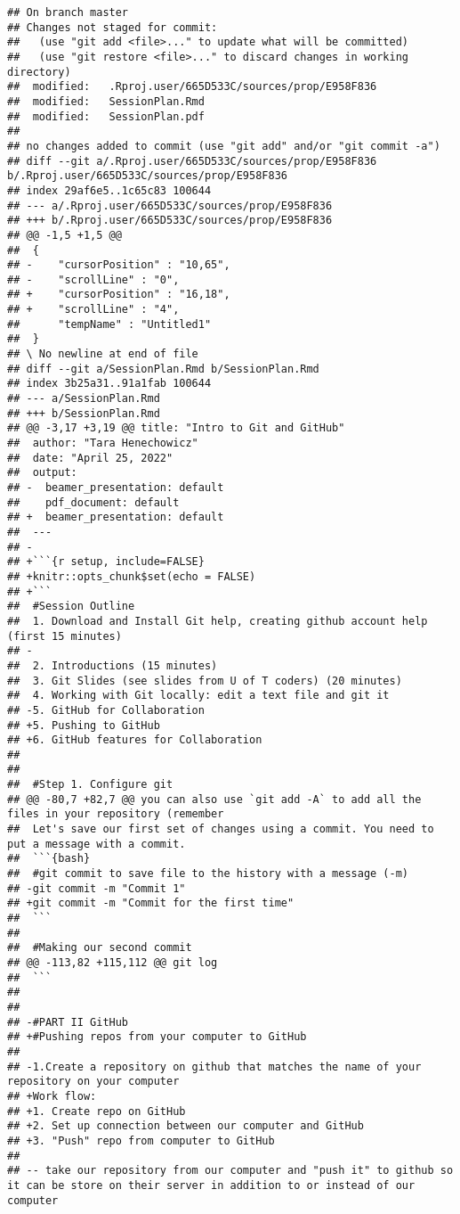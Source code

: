 \documentclass[]{article}
\begin{document}
\begin{verbatim}
## On branch master
## Changes not staged for commit:
##   (use "git add <file>..." to update what will be committed)
##   (use "git restore <file>..." to discard changes in working directory)
##  modified:   .Rproj.user/665D533C/sources/prop/E958F836
##  modified:   SessionPlan.Rmd
##  modified:   SessionPlan.pdf
## 
## no changes added to commit (use "git add" and/or "git commit -a")
## diff --git a/.Rproj.user/665D533C/sources/prop/E958F836 b/.Rproj.user/665D533C/sources/prop/E958F836
## index 29af6e5..1c65c83 100644
## --- a/.Rproj.user/665D533C/sources/prop/E958F836
## +++ b/.Rproj.user/665D533C/sources/prop/E958F836
## @@ -1,5 +1,5 @@
##  {
## -    "cursorPosition" : "10,65",
## -    "scrollLine" : "0",
## +    "cursorPosition" : "16,18",
## +    "scrollLine" : "4",
##      "tempName" : "Untitled1"
##  }
## \ No newline at end of file
## diff --git a/SessionPlan.Rmd b/SessionPlan.Rmd
## index 3b25a31..91a1fab 100644
## --- a/SessionPlan.Rmd
## +++ b/SessionPlan.Rmd
## @@ -3,17 +3,19 @@ title: "Intro to Git and GitHub"
##  author: "Tara Henechowicz"
##  date: "April 25, 2022"
##  output:
## -  beamer_presentation: default
##    pdf_document: default
## +  beamer_presentation: default
##  ---
## -
## +```{r setup, include=FALSE}
## +knitr::opts_chunk$set(echo = FALSE)
## +```
##  #Session Outline
##  1. Download and Install Git help, creating github account help (first 15 minutes)
## -
##  2. Introductions (15 minutes)
##  3. Git Slides (see slides from U of T coders) (20 minutes)
##  4. Working with Git locally: edit a text file and git it
## -5. GitHub for Collaboration
## +5. Pushing to GitHub
## +6. GitHub features for Collaboration
##  
##    
##  #Step 1. Configure git
## @@ -80,7 +82,7 @@ you can also use `git add -A` to add all the files in your repository (remember
##  Let's save our first set of changes using a commit. You need to put a message with a commit.
##  ```{bash}
##  #git commit to save file to the history with a message (-m)
## -git commit -m "Commit 1"
## +git commit -m "Commit for the first time"
##  ```
##  
##  #Making our second commit
## @@ -113,82 +115,112 @@ git log
##  ```
##  
##  
## -#PART II GitHub
## +#Pushing repos from your computer to GitHub
##  
## -1.Create a repository on github that matches the name of your repository on your computer
## +Work flow: 
## +1. Create repo on GitHub
## +2. Set up connection between our computer and GitHub
## +3. "Push" repo from computer to GitHub
##  
## -- take our repository from our computer and "push it" to github so it can be store on their server in addition to or instead of our computer

\end{verbatim}
\end{document}
